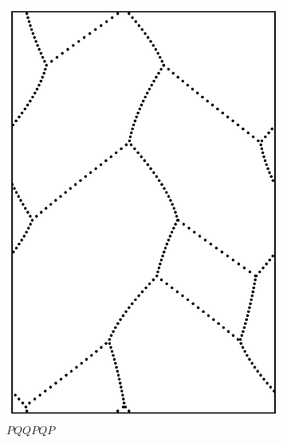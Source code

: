 \documentclass[12pt,twoside]{reedthesis}
\theoremstyle{definition}
\begin{document}
\begin{figure}[h]
\begin{subfigure}[t]{0.24\textwidth}
    \includegraphics[width=\textwidth]{figures/string_cheese_appendix/pqqpqp.pdf}
    \caption*{$PQQPQP$}
    \vspace{5mm}
  \end{subfigure}
  \hfill
  \begin{subfigure}[t]{0.24\textwidth}

\end{subfigure}
\end{figure}
\end{document}
